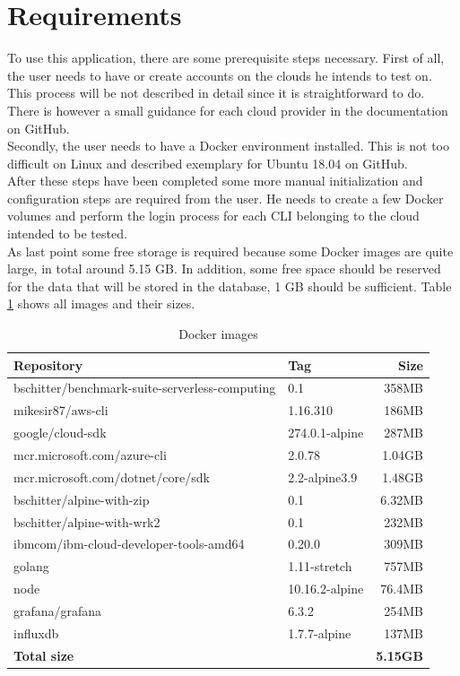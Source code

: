 \newpage

\section{Requirements}
To use this application, there are some prerequisite steps necessary. First of all, the user needs to have or create accounts on the clouds he intends to test on. This process will be not described in detail since it is straightforward to do. There is however a small guidance for each cloud provider in the documentation on GitHub.\\
Secondly, the user needs to have a Docker environment installed. This is not too difficult on Linux and described exemplary for Ubuntu 18.04 on GitHub.\\
After these steps have been completed some more manual initialization and configuration steps are required from the user. He needs to create a few Docker volumes and perform the login process for each \gls{CLI} belonging to the cloud intended to be tested.\\
As last point some free storage is required because some Docker images are quite large, in total around 5.15 GB. In addition, some free space should be reserved for the data that will be stored in the database, 1 GB should be sufficient. Table \ref{table:images} shows all images and their sizes.

\begin{table}[htp]
\centering
\captionsetup[table]{justification=centering, labelfont=bf}
\begin{tabular}{|l|l|r|}\hline
\textbf{Repository} & \textbf{Tag} & \textbf{Size} \\ \hline
bschitter/benchmark-suite-serverless-computing	&	0.1	&	358MB	\\ \hline
mikesir87/aws-cli	&	1.16.310	&	186MB	\\ \hline
google/cloud-sdk	&	274.0.1-alpine	&	287MB	\\ \hline
mcr.microsoft.com/azure-cli	&	2.0.78	&	1.04GB	\\ \hline
mcr.microsoft.com/dotnet/core/sdk	&	2.2-alpine3.9	&	1.48GB	\\ \hline
bschitter/alpine-with-zip	&	0.1	&	6.32MB	\\ \hline
bschitter/alpine-with-wrk2	&	0.1	&	232MB	\\ \hline
ibmcom/ibm-cloud-developer-tools-amd64	&	0.20.0	&	309MB	\\ \hline
golang	&	1.11-stretch	&	757MB	\\ \hline
node	&	10.16.2-alpine	&	76.4MB	\\ \hline
grafana/grafana	&	6.3.2	&	254MB	\\ \hline
influxdb	&	1.7.7-alpine	&	137MB	\\ \hline
\textbf{Total size} & & \textbf{5.15GB}\\ \hline
\end{tabular}
\caption[Docker images]{Docker images}
\label{table:images}
\end{table}

